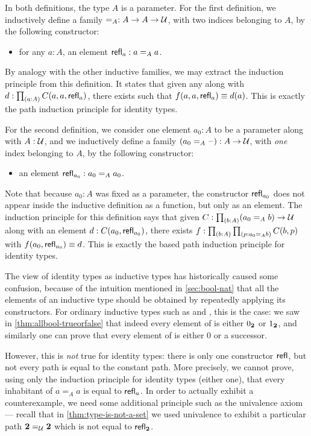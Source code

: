In both definitions, the type $A$ is a parameter.
For the first definition, we inductively define a family $=_A : A\to A\to \mathcal{U}$, with two indices belonging to $A$, by the following constructor:
\begin{itemize}
\item for any $a:A$, an element $\mathsf{refl}_{a} : a=_A a$.
\end{itemize}
By analogy with the other inductive families, we may extract the induction principle from this definition.
It states that given any  along with $d:\prd{a:A} C(a,a,\refl{a})$, there exists  such that $f(a,a,\mathsf{refl}_{a})\equiv d(a)$.
This is exactly the path induction principle for identity types.

For the second definition, we consider one element $a_0:A$ to be a parameter along with $A:\mathcal{U}$, and we inductively define a family $(a_0 =_A \mathord{\hspace{1pt}\text{--}\hspace{1pt}}):A\to \mathcal{U}$, with \emph{one} index belonging to $A$, by the following constructor:
\begin{itemize}
\item an element $\mathsf{refl}_{a_0} : a_0 =_A a_0$.
\end{itemize}
Note that because $a_0:A$ was fixed as a parameter, the constructor $\mathsf{refl}_{a_0}$ does not appear inside the inductive definition as a function, but only as an element.
The induction principle for this definition says that given $C:\prd{b:A} (a_0 =_A b) \to \type$ along with an element $d:C(a_0,\mathsf{refl}_{a_0})$, there exists $f:\prd{b:A}{p:a_0 =_A b} C(b,p)$ with $f(a_0,\mathsf{refl}_{a_0})\equiv d$.
This is exactly the based path induction principle for identity types.

The view of identity types as inductive types has historically caused some confusion, because of the intuition mentioned in \cref{sec:bool-nat} that all the elements of an inductive type should be obtained by repeatedly applying its constructors.
For ordinary inductive types such as \bool and \nat, this is the case: we saw in \cref{thm:allbool-trueorfalse} that indeed every element of \bool is either ${0_{\mathbf{2}}}$ or ${1_{\mathbf{2}}}$, and similarly one can prove that every element of \nat is either $0$ or a successor.

However, this is \emph{not} true for identity types: there is only one constructor $\mathsf{refl}_{}$, but not every path is equal to the constant path.
More precisely, we cannot prove, using only the induction principle for identity types (either one), that every inhabitant of $a=_A a$ is equal to $\mathsf{refl}_{a}$.
In order to actually exhibit a counterexample, we need some additional principle such as the univalence axiom --- recall that in \cref{thm:type-is-not-a-set} we used univalence to exhibit a particular path $\mathbf{2}=_\mathcal{U}\mathbf{2}$ which is not equal to $\mathsf{refl}_{\mathbf{2}}$.

